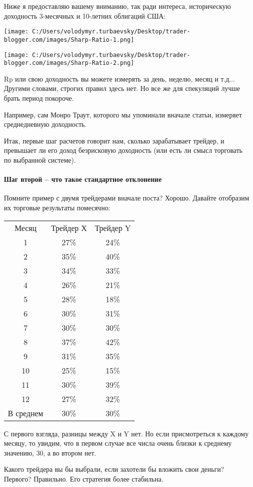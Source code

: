 \documentclass[a5paper]{article}
\begin{document}
Ниже я предоставляю вашему вниманию, так ради интереса, историческую доходность 3-месячных и 10-летних облигаций США:

\texttt{[image: C:/Users/volodymyr.turbaevsky/Desktop/trader-blogger.com/images/Sharp-Ratio-1.png]}

\texttt{[image: C:/Users/volodymyr.turbaevsky/Desktop/trader-blogger.com/images/Sharp-Ratio-2.png]}

Rp или свою доходность вы можете измерять за день, неделю, месяц и т.д... Другими словами, строгих правил здесь нет. Но все же для спекуляций лучше брать период покороче.

Например, сам Монро Траут, которого мы упоминали вначале статьи, измеряет среднедневную доходность.

    Итак, первые шаг расчетов говорит нам, сколько зарабатывает трейдер, и превышает ли его доход безрисковую доходность (или есть ли смысл торговать по выбранной системе).

\paragraph{Шаг второй – что такое стандартное отклонение}

Помните пример с двумя трейдерами вначале поста? Хорошо. Давайте
отобразим их торговые результаты помесячно:

\begin{tabular}{ccc}
 Месяц	&Трейдер Х&Трейдер Y\\
1&27\%&24\%\\
2&35\%&40\%\\
3&34\%&33\%\\
4&26\%&21\%\\
5&28\%&18\%\\
6&30\%&31\%\\
7&30\%&30\%\\
8&37\%&42\%\\
9&31\%&35\%\\
10&25\%&15\%\\
11&30\%&39\%\\
12&27\%&32\%\\
В среднем&30\%&30\%\\
\end{tabular}

С первого взгляда, разницы между X и Y нет. Но если присмотреться к каждому месяцу, то увидим, что в первом случае все числа очень близки к среднему значению, 30, а во втором нет.

Какого трейдера вы бы выбрали, если захотели бы вложить свои деньги? Первого? Правильно. Его стратегия более стабильна.
\end{document}

